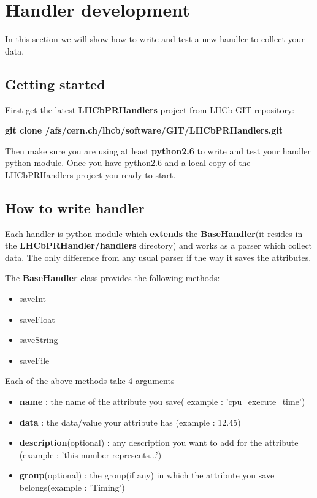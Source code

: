 \documentclass{lhcbnote}
\begin{document}
\section{Handler development}

In this section we will show how to write and test a new handler to collect your data.

\subsection{Getting started}

First get the latest {\bf LHCbPRHandlers} project from LHCb GIT repository:

\vspace{2 mm}

{\bf git clone /afs/cern.ch/lhcb/software/GIT/LHCbPRHandlers.git}

\vspace{2 mm}

Then make sure you are using at least {\bf python2.6} to write and test your handler python module.
Once you have python2.6 and a local copy of the LHCbPRHandlers project you ready to start.

\subsection{How to write handler}

Each handler is python module which {\bf extends} the {\bf BaseHandler}(it resides in the {\bf LHCbPRHandler/handlers} directory)
and works as a parser which collect data. The only difference from any usual parser if the way it saves the attributes.

\vspace{2 mm}

The {\bf BaseHandler} class provides the following methods:
\begin{itemize}
\item			
saveInt
\item
saveFloat
\item
saveString
\item
saveFile
\end{itemize}

Each of the above methods take 4 arguments
\begin{itemize}
\item
{\bf name} : the name of the attribute you save( example : 'cpu\_execute\_time')  
\item
{\bf data} : the data/value your attribute has (example : 12.45)
\item
{\bf description}(optional) : any description you want to add for the attribute (example : 'this number represents...')
\item
{\bf group}(optional) : the group(if any) in which the attribute you save belongs(example : 'Timing')
\end{itemize}
\end{document}
